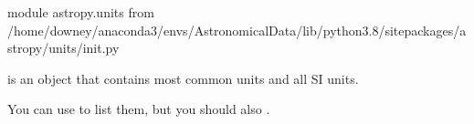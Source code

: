 \documentclass[letterpaper,10pt,english]{sphinxmanual}
\begin{document}
\begin{sphinxVerbatim}[commandchars=\\\{\}]
\PYGZlt{}module \PYGZsq{}astropy.units\PYGZsq{} from \PYGZsq{}/home/downey/anaconda3/envs/AstronomicalData/lib/python3.8/site\PYGZhy{}packages/astropy/units/\PYGZus{}\PYGZus{}init\PYGZus{}\PYGZus{}.py\PYGZsq{}\PYGZgt{}
\end{sphinxVerbatim}

 is an object that contains most common units and all SI units.

You can use  to list them, but you should also .

\begin{sphinxVerbatim}[commandchars=\\\{\}]
\end{sphinxVerbatim}
\end{document}
